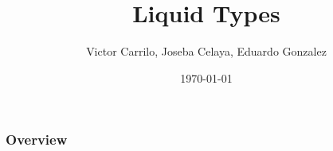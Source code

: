 \documentclass{beamer}
\title[Short title]{Liquid Types}
\author{Victor Carrilo, Joseba Celaya, Eduardo Gonzalez}
\institute[UCM/UAM/UPM]{
Universidad Complutense de Madrid\\
\medskip
}
\date{\today}
\begin{document}
\begin{frame}
\titlepage 
\end{frame}

\begin{frame}
\frametitle{Overview} 
\tableofcontents 
\end{frame}







\end{document}
